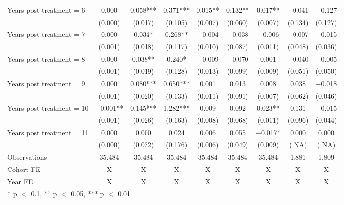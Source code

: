 \begin{table}[H]
{\begin{threeparttable}
\begin{tabular}[t]{lcccccccc}
Years post treatment = 6 & \num{ 0.000} & \num{ 0.058}*** & \num{ 0.371}*** & \num{ 0.015}** & \num{ 0.132}** & \num{ 0.017}** & \num{-0.041} & \num{-0.127}\\
 & (\num{0.000}) & (\num{0.017}) & (\num{0.105}) & (\num{0.007}) & (\num{0.060}) & (\num{0.007}) & (\num{0.134}) & (\num{0.127})\\
Years post treatment = 7 & \num{ 0.000} & \num{ 0.034}* & \num{ 0.268}** & \num{-0.004} & \num{-0.038} & \num{-0.006} & \num{-0.007} & \num{-0.015}\\
 & (\num{0.001}) & (\num{0.018}) & (\num{0.117}) & (\num{0.010}) & (\num{0.087}) & (\num{0.011}) & (\num{0.048}) & (\num{0.036})\\
Years post treatment = 8 & \num{ 0.000} & \num{ 0.038}** & \num{ 0.240}* & \num{-0.009} & \num{-0.070} & \num{ 0.001} & \num{-0.040} & \num{-0.005}\\
 & (\num{0.001}) & (\num{0.019}) & (\num{0.128}) & (\num{0.013}) & (\num{0.099}) & (\num{0.009}) & (\num{0.051}) & (\num{0.050})\\
Years post treatment = 9 & \num{ 0.000} & \num{ 0.080}*** & \num{ 0.650}*** & \num{ 0.001} & \num{ 0.013} & \num{ 0.008} & \num{ 0.038} & \num{-0.018}\\
 & (\num{0.001}) & (\num{0.020}) & (\num{0.133}) & (\num{0.011}) & (\num{0.091}) & (\num{0.007}) & (\num{0.062}) & (\num{0.046})\\
Years post treatment = 10 & \num{-0.001}** & \num{ 0.145}*** & \num{ 1.282}*** & \num{ 0.009} & \num{ 0.092} & \num{ 0.023}** & \num{ 0.131} & \num{-0.015}\\
 & (\num{0.001}) & (\num{0.026}) & (\num{0.163}) & (\num{0.008}) & (\num{0.068}) & (\num{0.011}) & (\num{0.096}) & (\num{0.044})\\
Years post treatment = 11 & \num{ 0.000} & \num{ 0.000} & \num{ 0.024} & \num{ 0.006} & \num{ 0.055} & \num{-0.017}* & \num{ 0.000} & \num{ 0.000}\\
 & (\num{0.000}) & (\num{0.032}) & (\num{0.176}) & (\num{0.006}) & (\num{0.049}) & (\num{0.009}) & (\num{   NA}) & (\num{   NA})\\
\midrule
Observations & \num{35,484} & \num{35,484} & \num{35,484} & \num{35,484} & \num{35,484} & \num{35,484} & \num{1,881} & \num{1,809}\\
Cohort FE & X & X & X & X & X & X & X & X\\
Year FE & X & X & X & X & X & X & X & X\\
\bottomrule
\multicolumn{9}{l}{\rule{0pt}{1em}* p $<$ 0.1, ** p $<$ 0.05, *** p $<$ 0.01}\\

\end{tabular}
\end{threeparttable}}
\end{table}
